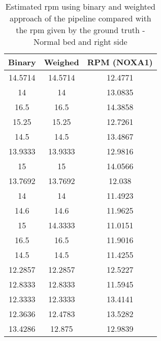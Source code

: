 \begin{table}[h]
    \centering
    \begin{tabular}{|c|c|c|}
 
    \hline 
    Binary & Weighed & RPM (NOXA1) \\ 
    
    \hline 
    14.5714& 14.5714  & 12.4771  \\ 
    14  & 14 & 13.0835  \\ 
    16.5 & 16.5 & 14.3858  \\ 
     15.25  & 15.25 & 12.7261  \\ 
    14.5 & 14.5  & 13.4867  \\ 
    13.9333  & 13.9333  & 12.9816  \\ 
    15  & 15  & 14.0566  \\ 
    13.7692  & 13.7692  & 12.038 \\ 
    14  & 14  & 11.4923  \\ 
    14.6  & 14.6  & 11.9625  \\ 
    15  & 14.3333  & 11.0151  \\ 
    16.5  & 16.5  & 11.9016  \\ 
    14.5  & 14.5  & 11.4255  \\ 
    12.2857  & 12.2857  & 12.5227  \\ 
    12.8333  & 12.8333 & 11.5945 \\ 
    12.3333  & 12.3333  & 13.4141  \\ 
    12.3636  & 12.4783  & 13.5282  \\ 
    13.4286  & 12.875  & 12.9839  \\ 

    \hline 
\end{tabular}
\caption{Estimated rpm using binary and weighted approach of the pipeline
compared with the rpm given by the ground truth
- Normal bed and right side}
\label{tab:RighttNormalStillsg}

\end{table}